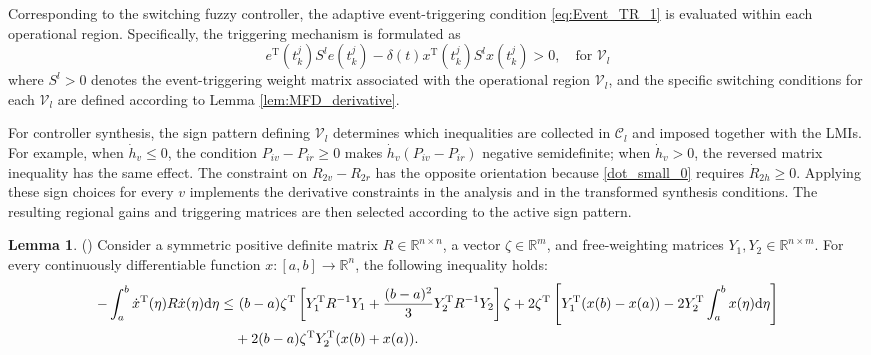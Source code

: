 \documentclass[preprint,review,fleqn,sort&compress,3p]{elsarticle}
\theoremstyle{definition} %
\theoremstyle{definition}%
\newtheorem{Lem}{Lemma}[section]
\newif\ifreviewmarkup
\DeclareRobustCommand{\revadd}[1]{{\ifreviewmarkup\color{revisiongreen}\hypersetup{linkcolor=revisiongreen,citecolor=revisiongreen}\fi#1}}
\begin{document}
Corresponding to the switching fuzzy controller, the adaptive event-triggering condition \eqref{eq:Event_TR_1} is evaluated within each operational region. Specifically, the triggering mechanism is formulated as
\begin{equation} 
 e^{\mathrm{T}}(t^j_{k}) S^l e(t^j_{k}) - \delta(t) x^{\mathrm{T}}(t_{k}^j) S^l x(t_{k}^j) > 0, \quad \text{for } \mathcal{V}_l
\end{equation}
where $S^l>0$ denotes the event-triggering weight matrix associated with the operational region $\mathcal{V}_l$, and the specific switching conditions for each $\mathcal{V}_l$ are defined according to Lemma \ref{lem:MFD_derivative}.

\label{rev:M26}\revadd{For controller synthesis, the sign pattern defining $\mathcal V_l$ determines which inequalities are collected in $\mathcal C_l$ and imposed together with the LMIs. For example, when $\dot h_v\leq0$, the condition $P_{iv}-P_{ir}\geq0$ makes $\dot h_v(P_{iv}-P_{ir})$ negative semidefinite; when $\dot h_v>0$, the reversed matrix inequality has the same effect. The constraint on $R_{2v}-R_{2r}$ has the opposite orientation because \eqref{dot_small_0} requires $\dot R_{2h}\geq0$. Applying these sign choices for every $v$ implements the derivative constraints in the analysis and in the transformed synthesis conditions. The resulting regional gains and triggering matrices are then selected according to the active sign pattern.}

\begin{Lem}\label{lem2}(\cite{guanModifiedLoopedFunctional2021a}) 
Consider a symmetric positive definite matrix $R \in \mathbb{R}^{n\times n}$, a vector $\zeta \in \mathbb{R}^{m}$, and free-weighting matrices $Y_1, Y_2 \in \mathbb{R}^{n\times m}$. For every continuously differentiable function $x : [a,b] \rightarrow \mathbb{R}^{n}$, the following inequality holds:
\begin{align}
	-\int_{a}^{b} \dot{x}^{\mathrm{T}}(\eta) R \dot{x}(\eta) \mathrm{d}\eta 
	\le & \ (b-a) \zeta^{\mathrm{T}} \left[ Y_1^{\mathrm{T}} R^{-1} Y_1 
	+ \frac{(b-a)^2}{3} Y_2^{\mathrm{T}} R^{-1} Y_2 \right] \zeta 
	 + 2\zeta^{\mathrm{T}} \left[ Y_1^{\mathrm{T}} (x(b) - x(a)) 
	 - 2Y_2^{\mathrm{T}} \int_{a}^{b} x(\eta)\mathrm{d}\eta \right] \notag \\
	& + 2(b-a) \zeta^{\mathrm{T}} Y_2^{\mathrm{T}} (x(b) + x(a)).
\end{align}
\end{Lem} 
\end{document}
